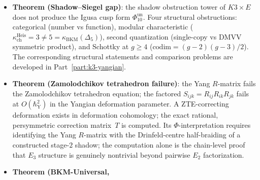 \begin{itemize}[leftmargin=1.5em,topsep=0.3ex,itemsep=0.5ex]
 $Y_\hbar(\mathfrak{so}(4, 20))$ (a BKM-to-Yangian lift attached to
 the Mukai form of signature $(4, 20)$; type $D_{12}$ orthogonal,
 not $\osp$ nor $\fgl$, because the Mukai form is symmetric
 indefinite, symmetric on both Hodge-graded parts), or its
 Hodge-parity $\Z/2$-super-extension
 $Y_\hbar(\mathfrak{so}(4 \mid 20))$ (non-Kac), provides the
 natural envelope. Kac $\mathfrak{osp}(4 \mid 20)$ is excluded: its
 odd form is symplectic.
	 For $K3 \times E$, six independent constructions (BKM
	 via Borcherds lift, lattice VOA via Frenkel--Kac, Kummer
	 orbifold, the framed CY-to-chiral specialisation
	 $\Phi_3^{(K3,E)}$ as the only route using the two-stage
	 assignment, sigma model BRST, and BLLPR 4d Schur
	 sector) approach a quantum vertex chiral group whose
	 denominator identity is $\Phi_{10}^{\mathrm{un}}$; their comparison is
	 Theorem~CY-C, with compact Hall bracket, PBW, and double descent as
	 separate data. At the Lie level the Hall
 branch is
 \[
 \bigoplus_{i=1}^{24}
 U_{q_1,q_2}\bigl(\widehat{\widehat{\mathfrak{gl}}}_1\bigr)^{(i)},
 \]
 and the non-abelian bracket appears only after vertex
 closure on the K3 Fock space:
 \[
 V_\alpha(z)\,V_\beta(w)\rightsquigarrow V_{\alpha+\beta},
 \qquad
 [e_\alpha,e_\beta]=N_{\alpha,\beta}\,e_{\alpha+\beta}.
 \]
 \item \textbf{Theorem (Shadow--Siegel gap)}: the shadow
 obstruction tower of $K3 \times E$ does not produce the
 Igusa cusp form $\Phi_{10}^{\mathrm{un}}$. Four structural obstructions:
 categorical (number vs function), modular characteristic
 ($\kappa_{\mathrm{ch}}^{\mathrm{Heis}} = 3 \neq 5 = \kappa_{\mathrm{BKM}}(\Delta_5)$),
 second quantization (single-copy vs DMVV symmetric product),
 and Schottky at $g \geq 4$
 ($\mathrm{codim} = (g-2)(g-3)/2$). The corresponding structural
 statements and comparison problems are developed in
 Part~\ref{part:k3-yangian}.
 \item \textbf{Theorem (Zamolodchikov tetrahedron failure)}:
 the Yang $R$-matrix fails the Zamolodchikov
 tetrahedron equation; the factored
 $S_{ijk} = R_{ij} R_{ik} R_{jk}$ fails at
 $O(\hbar_{\mathrm{Y}}^2)$ in the Yangian deformation parameter.
 A ZTE-correcting deformation exists in deformation cohomology; the
 exact rational, persymmetric correction matrix~$T$ is computed. Its
 $\Phi$-interpretation requires identifying the Yang $R$-matrix with
 the Drinfeld-centre half-braiding of a constructed stage-$2$ shadow;
	 the computation alone is the chain-level proof that $E_3$ structure
 is genuinely nontrivial beyond pairwise $E_2$ factorization.
 \item \textbf{Theorem (BKM-Universal,
}
\end{itemize}
